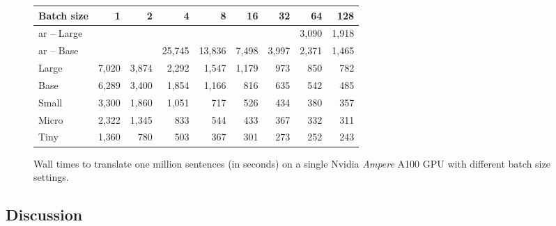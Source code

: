 \begin{figure}
  \centering

  
  \vspace{1\baselineskip}

  \begin{tabular}{lrrrrrrrr}
    \toprule
    Batch size & 1 & 2 & 4 & 8 & 16 & 32 & 64 & 128 \\
    \midrule
    \acs{ar} -- Large &&  &  &  &  &  & 3,090 & 1,918 \\
    \acs{ar} -- Base  &&  & 25,745 & 13,836 & 7,498 & 3,997 & 2,371 & 1,465 \\
    \midrule
    Large & 7,020 & 3,874 & 2,292 & 1,547 & 1,179 & 973 & 850 & 782 \\
    Base  & 6,289 & 3,400 & 1,854 & 1,166 &   816 & 635 & 542 & 485 \\
    Small & 3,300 & 1,860 & 1,051 &   717 &   526 & 434 & 380 & 357 \\
    Micro & 2,322 & 1,345 &   833 &   544 &   433 & 367 & 332 & 311 \\
    Tiny  & 1,360 &   780 &   503 &   367 &   301 & 273 & 252 & 243 \\
    \bottomrule
  \end{tabular}

  \caption{Wall times to translate one million sentences (in seconds) on a
    single Nvidia \emph{Ampere} A100 GPU with different batch size settings.}%
  \label{fig:throughput:a100}
\end{figure}




\subsection{Discussion}%
\label{subsec:results:discussion}


